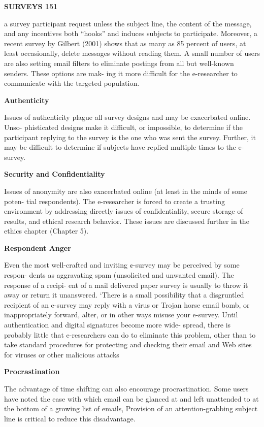 \documentclass [10pt,a4paper]{book}
\begin{document}
\begin{flushright}
\textbf{SURVEYS 151}
\end{flushright}
a survey participant request unless the subject line, the content of the message, and any
incentives both “hooks” and induces subjects to participate. Moreover, a recent survey
by Gilbert (2001) shows that as many as 85 percent of users, at least occasionally,
delete messages without reading them. A small number of users are also setting email
filters to eliminate postings from all but well-known senders. These options are mak-
ing it more difficult for the e-researcher to communicate with the targeted population.

\begin{flushleft}

 \textbf{Authenticity}
\end{flushleft}
Issues of authenticity plague all survey designs and may be exacerbated online. Unso-
phisticated designs make it difficult, or impossible, to determine if the participant
replying to the survey is the one who was sent the survey. Further, it may be difficult
to determine if subjects have replied multiple times to the e-survey.


\begin{flushleft}
\textbf{Security and Confidentiality}
\end{flushleft}
Issues of anonymity are also exacerbated online (at least in the minds of some poten-
tial respondents). The e-researcher is forced to create a trusting environment by
addressing directly issues of confidentiality, secure storage of results, and ethical
research behavior. These issues are discussed further in the ethics chapter (Chapter 5).

\begin{flushleft}
\textbf{Respondent Anger}
\end{flushleft}
Even the most well-crafted and inviting ¢-survey may be perceived by some respon-
dents as aggravating spam (unsolicited and unwanted email). The response of a recipi-
ent of a mail delivered paper survey is usually to throw it away or return it unanswered.
‘There is a small possibility that a disgruntled recipient of an e-survey may reply with
a virus or Trojan horse email bomb, or inappropriately forward, alter, or in other ways
misuse your e-survey. Until authentication and digital signatures become more wide-
spread, there is probably little that e-researchers can do to eliminate this problem,
other than to take standard procedures for protecting and checking their email and
Web sites for viruses or other malicious attacks
\begin{flushleft}
\textbf{Procrastination}
\end{flushleft}
The advantage of time shifting can also encourage procrastination. Some users have
noted the ease with which email can be glanced at and left unattended to at the bottom
of a growing list of emails, Provision of an attention-grabbing subject line is critical to
reduce this disadvantage.
\end{document}
